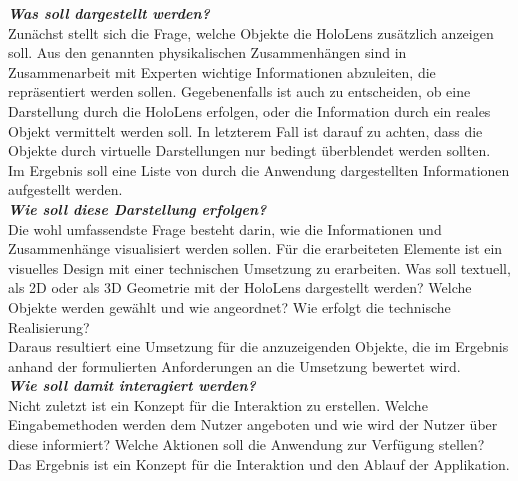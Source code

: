 \textbf{\textit{Was soll dargestellt werden?}}\\
Zunächst stellt sich die Frage, welche Objekte die HoloLens zusätzlich anzeigen soll. Aus den genannten physikalischen Zusammenhängen sind in Zusammenarbeit mit Experten wichtige Informationen abzuleiten, die repräsentiert werden sollen. Gegebenenfalls ist auch zu entscheiden, ob eine Darstellung durch die HoloLens erfolgen, oder die Information durch ein reales Objekt vermittelt werden soll. In letzterem Fall ist darauf zu achten, dass die Objekte durch virtuelle Darstellungen nur bedingt überblendet werden sollten.\\
\noindent\hspace*{5mm}
Im Ergebnis soll eine Liste von durch die Anwendung dargestellten Informationen aufgestellt werden.\\

\textbf{\textit{Wie soll diese Darstellung erfolgen?}}\\
Die wohl umfassendste Frage besteht darin, wie die Informationen und Zusammenhänge visualisiert werden sollen. Für die erarbeiteten Elemente ist ein visuelles Design mit einer technischen Umsetzung zu erarbeiten. Was soll textuell, als 2D oder als 3D Geometrie mit der HoloLens dargestellt werden? Welche Objekte werden gewählt und wie angeordnet? Wie erfolgt die technische Realisierung?\\
\noindent\hspace*{5mm}
Daraus resultiert eine Umsetzung für die anzuzeigenden Objekte, die im Ergebnis anhand der formulierten Anforderungen an die Umsetzung bewertet wird.\\

\textbf{\textit{Wie soll damit interagiert werden?}}\\
Nicht zuletzt ist ein Konzept für die Interaktion zu erstellen. Welche Eingabemethoden werden dem Nutzer angeboten und wie wird der Nutzer über diese informiert? Welche Aktionen soll die Anwendung zur Verfügung stellen?\\
\noindent\hspace*{5mm}
Das Ergebnis ist ein Konzept für die Interaktion und den Ablauf der Applikation.
